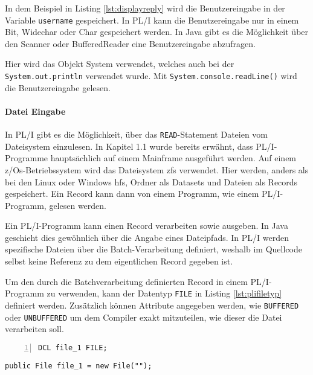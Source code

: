 In dem Beispiel in Listing \ref{lst:displayreply} wird die Benutzereingabe in der
Variable \verb+username+ gespeichert.
In PL/I kann die Benutzereingabe nur in einem Bit, Widechar oder Char gespeichert werden. 
In Java gibt es die Möglichkeit über den Scanner oder BufferedReader eine Benutzereingabe abzufragen.

Hier wird das Objekt System verwendet, welches auch bei der \verb+System.out.println+ verwendet wurde.
Mit \verb+System.console.readLine()+ wird die Benutzereingabe gelesen.

\paragraph*{Datei Eingabe}
In PL/I gibt es die Möglichkeit, über das \verb+READ+-Statement Dateien vom Dateisystem einzulesen.
In Kapitel 1.1 wurde bereits erwähnt, dass PL/I-Programme hauptsächlich auf einem Mainframe ausgeführt werden.
Auf einem z/Os-Betriebssystem wird das Dateisystem \ac{zfs} verwendet.
Hier werden, anders als bei den  Linux oder Windows \ac{hfs}, Ordner als Datasets und Dateien als Records gespeichert.
Ein Record kann dann von einem Programm, wie einem PL/I-Programm, gelesen werden.

Ein PL/I-Programm kann einen Record verarbeiten sowie ausgeben. In Java geschieht dies gewöhnlich über die Angabe eines Dateipfads.
In PL/I werden spezifische Dateien über die Batch-Verarbeitung definiert, weshalb im Quellcode selbst keine Referenz zu dem eigentlichen Record gegeben ist.

Um den durch die Batchverarbeitung definierten Record in einem PL/I-Programm zu verwenden, kann der Datentyp \verb+FILE+ in Listing \ref{lst:plifiletyp} definiert werden. Zusätzlich können Attribute angegeben werden, wie \verb+BUFFERED+ oder \verb+UNBUFFERED+ um dem Compiler exakt mitzuteilen, wie dieser die Datei verarbeiten soll.

\begin{minipage}[b]{0.48\linewidth}
	\centering
	\lstset{language=PL/I,label=SliceExaple}
	\begin{lstlisting}[frame=single, numbers=left, mathescape,%
		caption={Transformation Dateityp}, label={lst:plifiletyp}]
		DCL file_1 FILE;
	\end{lstlisting}
\end{minipage}
\hspace{0.5cm}
\begin{minipage}[b]{0.48\linewidth}
	\centering
	\lstset{language=Java,label=SliceExaple}
	\begin{lstlisting}[frame=single, mathescape,%
		title={" "}]
		public File file_1 = new File("");
	\end{lstlisting}
\end{minipage}  

